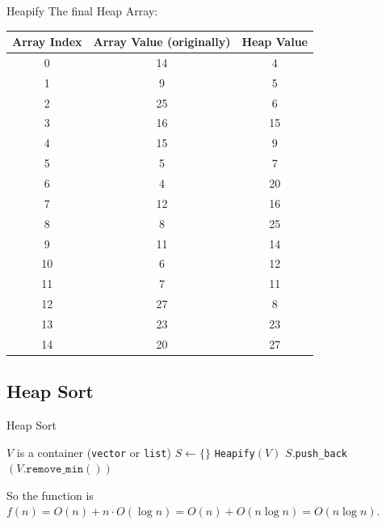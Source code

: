 \documentclass[10pt,compress]{beamer}
\begin{document}
\begin{frame}{Heapify}
  The final Heap Array:

  \begin{tabular}{c|c|c}
    Array Index & Array Value (originally) & Heap Value \\\hline
    0           & 14                       & 4          \\
    1           & 9                        & 5          \\
    2           & 25                       & 6          \\
    3           & 16                       & 15         \\
    4           & 15                       & 9          \\
    5           & 5                        & 7          \\
    6           & 4                        & 20         \\
    7           & 12                       & 16         \\
    8           & 8                        & 25         \\
    9           & 11                       & 14         \\
    10          & 6                        & 12         \\
    11          & 7                        & 11         \\
    12          & 27                       & 8          \\
    13          & 23                       & 23         \\
    14          & 20                       & 27
  \end{tabular}
\end{frame}

\subsection{Heap Sort}

\begin{frame}{Heap Sort}
  \begin{algorithm}[H]
    \caption{Heap Sort}\label{alg:heap_sort}
    \begin{algorithmic}
      \Require $V$ is a container (\texttt{vector} or \texttt{list})
      \State $S\gets\{\}$ 
      \State \texttt{Heapify}$(V)$ 
       
      \State $S$.\texttt{push\_back}$(V\text{.}\texttt{remove\_min}())$ 
      \EndWhile
    \end{algorithmic}
  \end{algorithm}
  So the function is $f(n)=O(n)+n\cdot O(\log n)=O(n) + O(n\log n)=O(n\log n)$.
\end{frame}
\end{document}
